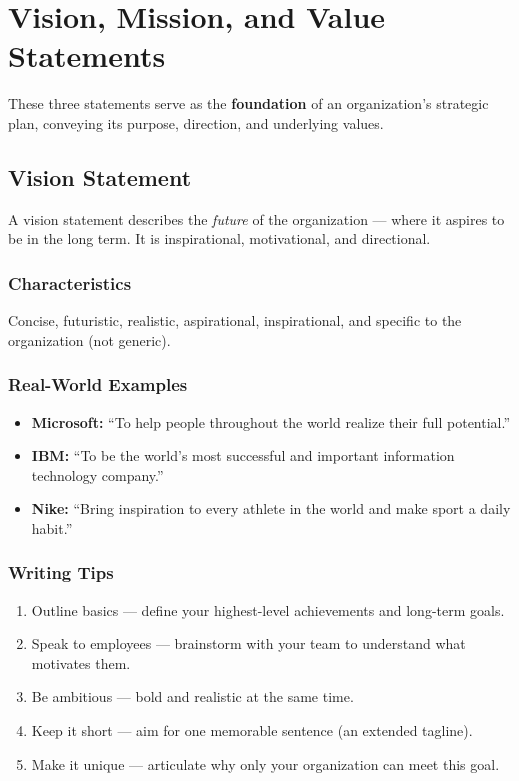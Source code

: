 \documentclass[11pt, letterpaper]{article}
\begin{document}
\newpage

\section{Vision, Mission, and Value Statements}

\begin{defbox}
These three statements serve as the \textbf{foundation} of an organization's strategic plan, conveying its purpose, direction, and underlying values.
\end{defbox}

\subsection{Vision Statement}

A vision statement describes the \textit{future} of the organization --- where it aspires to be in the long term. It is inspirational, motivational, and directional.

\subsubsection{Characteristics}
Concise, futuristic, realistic, aspirational, inspirational, and specific to the organization (not generic).

\subsubsection{Real-World Examples}
\begin{itemize}[leftmargin=*]
  \item \textbf{Microsoft:} ``To help people throughout the world realize their full potential.''
  \item \textbf{IBM:} ``To be the world's most successful and important information technology company.''
  \item \textbf{Nike:} ``Bring inspiration to every athlete in the world and make sport a daily habit.''
\end{itemize}

\subsubsection{Writing Tips}
\begin{enumerate}[leftmargin=*, label=\arabic*.]
  \item Outline basics --- define your highest-level achievements and long-term goals.
  \item Speak to employees --- brainstorm with your team to understand what motivates them.
  \item Be ambitious --- bold and realistic at the same time.
  \item Keep it short --- aim for one memorable sentence (an extended tagline).
  \item Make it unique --- articulate why only your organization can meet this goal.
\end{enumerate}
\end{document}
